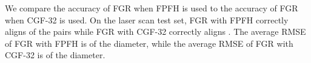 We compare the accuracy of FGR when FPFH is used to the accuracy of FGR when CGF-32 is used. On the laser scan test set, FGR with FPFH correctly aligns  of the pairs while FGR with CGF-32 correctly aligns . The average RMSE of FGR with FPFH is  of the diameter, while the average RMSE of FGR with CGF-32 is  of the diameter.

\begin{comment}
    Figure \ref{fig:lucyfgr} shows alignments computed for two pairs from Lucy by FGR using our feature space and FPFH. For the first pair both methods succeed, but the aligment computed using our feature space is tighter, exhibiting less error per point than that computed using FPFH. For the second pair FGR using FPFH fails to compute a correct alignment. Using our feature space, FGR is able to find a tight alignment between the fragments.
    \begin{figure*}[!t]
    \begin{center}
    \begin{minipage}{0.97\textwidth}
    \begin{tabular}{c c c c}
        \texttt{[image: render-1-source.png]} &
        \texttt{[image: render-1-fpfh.png]} &
        \texttt{[image: render-2-source.png]} &
        \texttt{[image: render-2-fpfh.png]}\\
         \small{(a) source 1} & \small{(b) FGR + FPFH } & \small{(c) source 2} & \small{(d) FGR + FPFH} \\
        \texttt{[image: render-1-target.png]} &
        \texttt{[image: render-1-ours.png]} &
        \texttt{[image: render-2-target.png]} &
        \texttt{[image: render-2-ours.png]} \\
        \small{(e) target 1} & \small{(f) FGR + Ours} & \small{(g) target 2} & \small{(h) FGR + Ours}
    \end{tabular}
    \end{minipage}\hfill
    \begin{minipage}{0.03\textwidth}
    \texttt{[image: fgr\_bar.pdf]}
    \end{minipage}
    \end{center}
\caption{For the pair (a) and (e), FGR is able to find a correct alignment using either FPFH (b) or our features (f). However the per point error, visualized as a color from yellow (0\% of diameter) to green (1\% of diameter), is lower for our feature space. For the pair (c) and (g), FGR fails to find an alignment using FPFH (d). Using our features, FGR finds a tight alignment (h).}
    \label{fig:lucyfgr}
    \end{figure*}
\end{comment}

